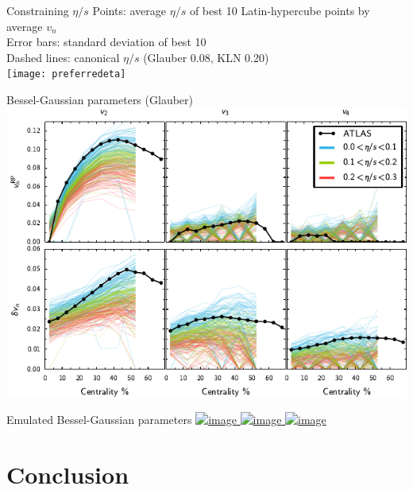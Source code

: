 \documentclass{beamer}
\begin{document}
\begin{frame}{Constraining $\eta/s$}
  \vspace{3mm}
  \small
  Points:  average $\eta/s$ of best 10 Latin-hypercube points by average $v_n$ \\
  Error bars:  standard deviation of best 10 \\
  Dashed lines:  canonical $\eta/s$ (Glauber 0.08, KLN 0.20) \\[1em]
  \texttt{[image: preferredeta]}
\end{frame}



\begin{frame}{Bessel-Gaussian parameters (Glauber)}
  \vspace{3mm}
  \includegraphics{bgparams}
\end{frame}


\begin{frame}[label=emuplots]{Emulated Bessel-Gaussian parameters}
  \vspace{3mm}
  \hyperlink{caveats}{
    \includegraphics<1>{emu0}
    \includegraphics<2>{emu1}
    \includegraphics<3>{emu2}
  }
\end{frame}


\section{Conclusion}
\end{document}
